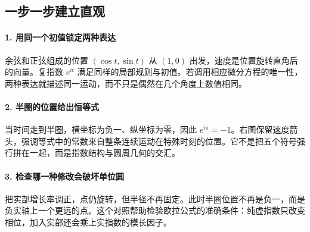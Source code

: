 \subsection*{一步一步建立直观}

\paragraph{1. 用同一个初值锁定两种表达}

余弦和正弦组成的位置 $(\cos t,\sin t)$ 从 $(1,0)$ 出发，速度是位置旋转直角后的向量。复指数 $e^{it}$ 满足同样的局部规则与初值。若调用相应微分方程的唯一性，两种表达就描述同一运动，而不只是偶然在几个角度上数值相同。



\paragraph{2. 半圈的位置给出恒等式}

当时间走到半圈，横坐标为负一、纵坐标为零，因此 $e^{i\pi}=-1$。右图保留速度箭头，强调等式中的常数来自整条连续运动在特殊时刻的位置。它不是把五个符号强行拼在一起，而是指数结构与圆周几何的交汇。



\paragraph{3. 检查哪一种修改会破坏单位圆}

把实部增长率调正，点仍旋转，但半径不再固定。此时半圈位置不再是负一，而是负实轴上一个更远的点。这个对照帮助检验欧拉公式的准确条件：纯虚指数只改变相位，加入实部还会乘上实指数的模长因子。

